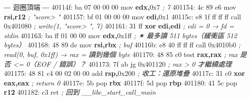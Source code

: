 \documentclass[10pt,a4paper]{article}
\newenvironment{Shaded}{\begin{snugshade}}{\end{snugshade}}
\newcommand{\BaseNTok}[1]{\textcolor[rgb]{0.00,0.00,0.81}{#1}}
\newcommand{\BuiltInTok}[1]{#1}
\newcommand{\CommentTok}[1]{\textcolor[rgb]{0.56,0.35,0.01}{\textit{#1}}}
\newcommand{\DecValTok}[1]{\textcolor[rgb]{0.00,0.00,0.81}{#1}}
\newcommand{\FloatTok}[1]{\textcolor[rgb]{0.00,0.00,0.81}{#1}}
\newcommand{\KeywordTok}[1]{\textcolor[rgb]{0.13,0.29,0.53}{\textbf{#1}}}
\newcommand{\NormalTok}[1]{#1}
\newcommand{\OperatorTok}[1]{\textcolor[rgb]{0.81,0.36,0.00}{\textbf{#1}}}
\renewenvironment{Shaded}{%
  \def\FrameCommand{\fboxsep=3.2pt\colorbox{shadecolor}}%
  \MakeFramed{\advance\hsize-\width\FrameRestore\small}%
}{%
  \endMakeFramed
}
\begin{document}
\begin{Shaded}
\begin{Highlighting}[]
\NormalTok{{-}{-}{-} 迴圈頂端 {-}{-}{-}}
\NormalTok{  40114f: ba }\DecValTok{07} \DecValTok{00} \DecValTok{00} \DecValTok{00}\NormalTok{     mov  }\KeywordTok{edx}\OperatorTok{,}\BaseNTok{0x7}    \CommentTok{; 7}
\NormalTok{  401154: 4c 89 e6           mov  }\KeywordTok{rsi}\OperatorTok{,}\KeywordTok{r12}    \CommentTok{; "score\textgreater{} "}
\NormalTok{  401157: bf }\DecValTok{01} \DecValTok{00} \DecValTok{00} \DecValTok{00}\NormalTok{     mov  }\KeywordTok{edi}\OperatorTok{,}\BaseNTok{0x1}
\NormalTok{  40115c: e8 }\FloatTok{1}\BaseNTok{f}\NormalTok{ ff ff ff     call }\BaseNTok{0x401080}   \CommentTok{; write(1, "score\textgreater{} ", 7)}
\NormalTok{  401161: 31 ff              }\OperatorTok{xor}  \KeywordTok{edi}\OperatorTok{,}\KeywordTok{edi}    \CommentTok{; edi = 0  → fd = stdin}
\NormalTok{  401163: ba ff }\DecValTok{01} \DecValTok{00} \DecValTok{00}\NormalTok{     mov  }\KeywordTok{edx}\OperatorTok{,}\BaseNTok{0x1ff}  \CommentTok{; ✶ 最多讀 511 bytes（緩衝區 512 bytes）}
\NormalTok{  401168: 48 89 de           mov  }\KeywordTok{rsi}\OperatorTok{,}\KeywordTok{rbx}    \CommentTok{; buf}
\NormalTok{  40116b: e8 }\DecValTok{40}\NormalTok{ ff ff ff     call }\BaseNTok{0x4010b0}   \CommentTok{; read(0, buf, 0x1ff)   → rax = 讀到幾個 byte}
\NormalTok{  401170: 48 85 c0           test }\KeywordTok{rax}\OperatorTok{,}\KeywordTok{rax}    \CommentTok{; rax 是否 \textless{}= 0（EOF / 錯誤）？}
\NormalTok{  401173: 7f ab              jg   }\BaseNTok{0x401120}   \CommentTok{; rax \textgreater{} 0 才繼續處理}
\NormalTok{  401175: 48 81 c4 }\DecValTok{00} \DecValTok{02} \DecValTok{00} \DecValTok{00}\NormalTok{  add }\KeywordTok{rsp}\OperatorTok{,}\BaseNTok{0x200}  \CommentTok{; 收工：還原堆疊}
\NormalTok{  40117c: 31 c0              }\OperatorTok{xor}  \KeywordTok{eax}\OperatorTok{,}\KeywordTok{eax}    \CommentTok{; return 0}
\NormalTok{  40117e: 5b                 }\BuiltInTok{pop}  \KeywordTok{rbx}
\NormalTok{  40117f: 5d                 }\BuiltInTok{pop}  \KeywordTok{rbp}
\NormalTok{  401180: 41 5c              }\BuiltInTok{pop}  \KeywordTok{r12}
\NormalTok{  401182: c3                 ret             }\CommentTok{; 回到 \_\_libc\_start\_call\_main}


\end{Highlighting}
\end{Shaded}
\end{document}
